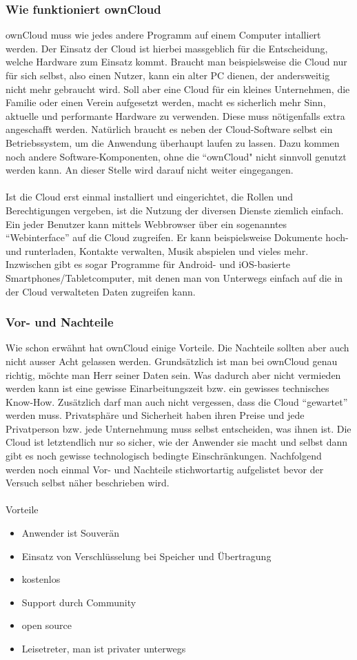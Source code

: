 \subsubsection{Wie funktioniert ownCloud}
ownCloud muss wie jedes andere Programm auf einem Computer intalliert werden. Der Einsatz der Cloud ist hierbei massgeblich für die Entscheidung, welche Hardware zum Einsatz kommt. Braucht man beispielsweise die Cloud nur für sich selbst, also einen Nutzer, kann ein alter PC dienen, der andersweitig nicht mehr gebraucht wird. Soll aber eine Cloud für ein kleines Unternehmen, die Familie oder einen Verein aufgesetzt werden, macht es sicherlich mehr Sinn, aktuelle und performante Hardware zu verwenden. Diese muss nötigenfalls extra angeschafft werden. Natürlich braucht es neben der Cloud-Software selbst ein Betriebssystem, um die Anwendung überhaupt laufen zu lassen. Dazu kommen noch andere Software-Komponenten, ohne die ``ownCloud" nicht sinnvoll genutzt werden kann. An dieser Stelle wird darauf nicht weiter eingegangen.
\\
\\
Ist die Cloud erst einmal installiert und eingerichtet, die Rollen und Berechtigungen vergeben, ist die Nutzung der diversen Dienste ziemlich einfach. Ein jeder Benutzer kann mittels Webbrowser über ein sogenanntes ``Webinterface'' auf die Cloud zugreifen. Er kann beispielsweise Dokumente hoch- und runterladen, Kontakte verwalten, Musik abspielen und vieles mehr.
Inzwischen gibt es sogar Programme für Android- und iOS-basierte Smartphones/Tabletcomputer, mit denen man von Unterwegs einfach auf die in der Cloud verwalteten Daten zugreifen kann.

\subsubsection{Vor- und Nachteile}
Wie schon erwähnt hat ownCloud einige Vorteile. Die Nachteile sollten aber auch nicht ausser Acht gelassen werden. Grundsätzlich ist man bei ownCloud genau richtig, möchte man Herr seiner Daten sein. Was dadurch aber nicht vermieden werden kann ist eine gewisse Einarbeitungszeit bzw. ein gewisses technisches Know-How. Zusätzlich darf man auch nicht vergessen, dass die Cloud ``gewartet'' werden muss. Privatsphäre und Sicherheit haben ihren Preise und jede Privatperson bzw. jede Unternehmung muss selbst entscheiden, was ihnen ist. Die Cloud ist letztendlich nur so sicher, wie der Anwender sie macht und selbst dann gibt es noch gewisse technologisch bedingte Einschränkungen.
Nachfolgend werden noch einmal Vor- und Nachteile stichwortartig aufgelistet bevor der Versuch selbst näher beschrieben wird.
\\
\\
Vorteile
\begin{itemize}
\item Anwender ist Souverän
\item Einsatz von Verschlüsselung bei Speicher und Übertragung
\item kostenlos
\item Support durch Community
\item open source
\item Leisetreter, man ist privater unterwegs
\end{itemize}

